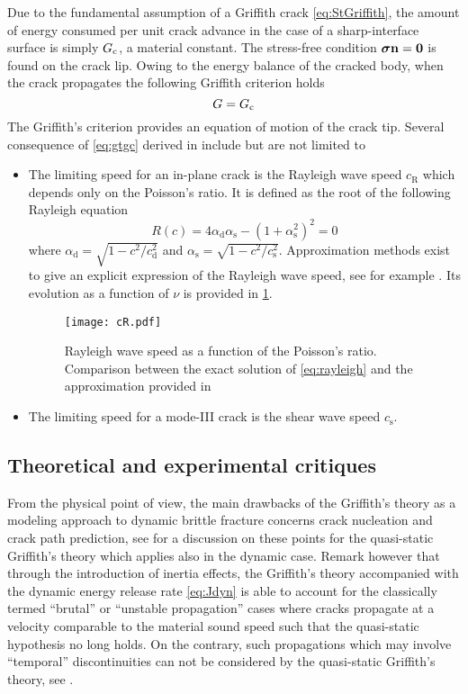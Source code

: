 Due to the fundamental assumption of a Griffith crack \eqref{eq:StGriffith}, the amount of energy consumed per unit crack advance in the case of a sharp-interface surface is simply $G_\mathrm{c}$, a material constant. The stress-free condition $\sig\vec{n}=\vec{0}$ is found on the crack lip. Owing to the energy balance of the cracked body, when the crack propagates the following Griffith criterion holds
\begin{equation} \label{eq:gtgc}
G=G_\mathrm{c}
\end{equation}
The Griffith's criterion provides an equation of motion of the crack tip. Several consequence of \eqref{eq:gtgc} derived in \cite{Freund:1990} include but are not limited to
\begin{itemize}
\item The limiting speed for an in-plane crack is the Rayleigh wave speed $c_\mathrm{R}$ which depends only on the Poisson's ratio. It is defined as the root of the following Rayleigh equation
\begin{equation} \label{eq:rayleigh}
R(c)=4\alpha_\mathrm{d}\alpha_\mathrm{s}-(1+\alpha_\mathrm{s}^2)^2=0
\end{equation}
where $\alpha_\mathrm{d}=\sqrt{1-c^2/c_\mathrm{d}^2}$ and $\alpha_\mathrm{s}=\sqrt{1-c^2/c_\mathrm{s}^2}$. Approximation methods exist to give an explicit expression of the Rayleigh wave speed, see for example \cite{RoyerClorennec:2007}. Its evolution as a function of $\nu$ is provided in \cref{fig:rayleigh}.
\begin{figure}[htbp]
\centering
\texttt{[image: cR.pdf]}
\caption{Rayleigh wave speed as a function of the Poisson's ratio. Comparison between the exact solution of \eqref{eq:rayleigh} and the approximation provided in \cite{RoyerClorennec:2007}} \label{fig:rayleigh}
\end{figure}

\item The limiting speed for a mode-III crack is the shear wave speed $c_\mathrm{s}$.
\end{itemize}

\subsection{Theoretical and experimental critiques}
From the physical point of view, the main drawbacks of the Griffith's theory as a modeling approach to dynamic brittle fracture concerns crack nucleation and crack path prediction, see \cite{FrancfortMarigo:1998} for a discussion on these points for the quasi-static Griffith's theory which applies also in the dynamic case. Remark however that through the introduction of inertia effects, the Griffith's theory accompanied with the dynamic energy release rate \eqref{eq:Jdyn} is able to account for the classically termed ``brutal'' or ``unstable propagation'' cases where cracks propagate at a velocity comparable to the material sound speed such that the quasi-static hypothesis no long holds. On the contrary, such propagations which may involve ``temporal'' discontinuities can not be considered by the quasi-static Griffith's theory, see \cite{FrancfortMarigo:1998}.

